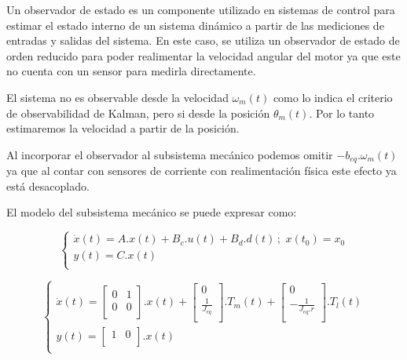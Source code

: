 \documentclass{article}
\begin{document}
Un observador de estado es un componente utilizado en sistemas de control para estimar el estado interno 
de un sistema dinámico a partir de las mediciones de entradas y salidas del sistema. En este caso, se
utiliza un observador de estado de orden reducido para poder realimentar la velocidad angular del motor 
ya que este no cuenta con un sensor para medirla directamente.

El sistema no es observable desde la velocidad $\omega_m(t)$ como lo indica el criterio de observabilidad 
de Kalman, pero si desde la posición $\theta_m(t)$. Por lo tanto estimaremos la velocidad a partir de la 
posición.

Al incorporar el observador al subsistema mecánico podemos omitir $-b_{eq}.\omega_{m}(t)$ ya que al 
contar con sensores de corriente con realimentación física este efecto ya está desacoplado.  

El modelo del subsistema mecánico se puede expresar como:

\begin{equation}
    \begin{cases}
        \dot{x}(t) = A.x(t) + B_c.u(t) +B_d.d(t)  \, ; \,\, x(t_0) = x_0\\
        y(t) = C.x(t) \\
    \end{cases}
\end{equation}

\begin{equation}
    \begin{cases}
        \dot{x}(t) = 
        \begin{bmatrix}
            0 & 1 \\
            0 & 0 \\
        \end{bmatrix}
        .x(t) + 
        \begin{bmatrix}
            0 \\
            \frac{1}{J_{eq}} \\
        \end{bmatrix}
        .T_m(t) +
        \begin{bmatrix}
            0 \\
            -\frac{1}{J_{eq}.r} \\
        \end{bmatrix}
        .T_l(t)\\
        y(t) = 
        \begin{bmatrix}
            1 & 0 \\
        \end{bmatrix}
        .x(t) \\
    \end{cases}
\end{equation}
\end{document}
